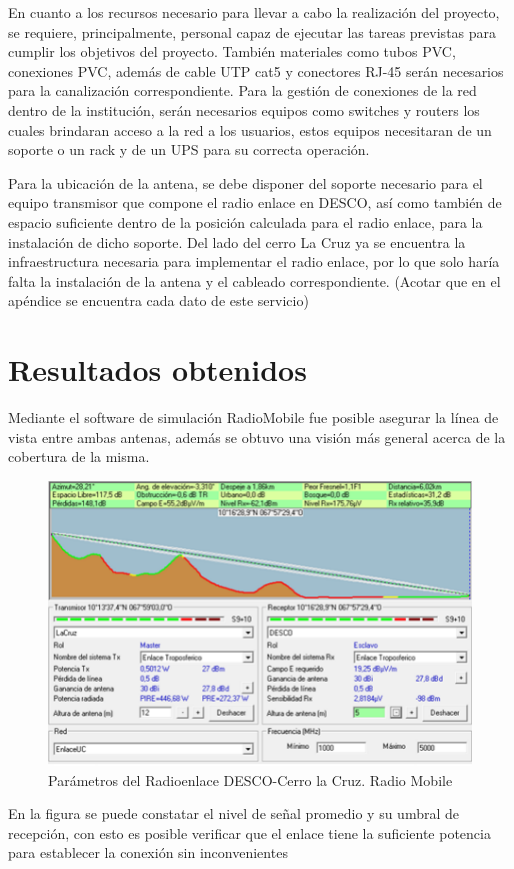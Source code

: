 \documentclass[11pt, a4paper, twosides]{report}
\begin{document}
En cuanto a los recursos necesario para llevar a cabo la realización del proyecto, se requiere, principalmente, personal capaz de ejecutar las tareas previstas para cumplir los objetivos del proyecto. También materiales como tubos PVC, conexiones PVC, además de cable UTP cat5 y conectores RJ-45 serán necesarios para la canalización correspondiente. Para la gestión de conexiones de la red dentro de la institución, serán necesarios equipos como switches y routers los cuales brindaran acceso a la red a los usuarios, estos equipos necesitaran de un soporte o un rack y de un UPS para su correcta operación.

Para la ubicación de la antena, se debe disponer del soporte necesario para el equipo transmisor que compone el radio enlace en DESCO, así como también de espacio suficiente dentro de la posición calculada para el radio enlace, para la instalación de dicho soporte.
Del lado del cerro La Cruz ya se encuentra la infraestructura necesaria para implementar el radio enlace, por lo que solo haría falta la instalación de la antena y el cableado correspondiente.
(Acotar que en el apéndice se encuentra cada dato de este servicio)


\chapter{Resultados obtenidos}
Mediante el software de simulación RadioMobile fue posible asegurar la línea de vista entre ambas antenas, además se obtuvo una visión más general acerca de la cobertura de la misma.

\begin{figure}[h]
    \centering
    \includegraphics[width=0.55\linewidth]{rm.png}
    \caption{Parámetros del Radioenlace DESCO-Cerro la Cruz. Radio Mobile}
    \label{fig:rm}
\end{figure}

En la figura se puede constatar el nivel de señal promedio y su umbral de recepción, con esto es posible verificar que el enlace tiene la suficiente potencia para establecer la conexión sin inconvenientes 
\end{document}
